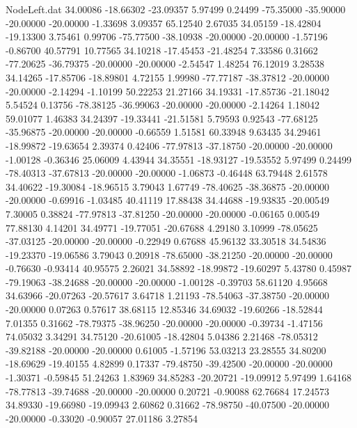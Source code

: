 \begin{filecontents}{NodeLeft.dat}
  34.00086  -18.66302  -23.09357     5.97499    0.24499  -75.35000  -35.90000  -20.00000  -20.00000   -1.33698    3.09357   65.12540    2.67035
  34.05159  -18.42804  -19.13300     3.75461    0.99706  -75.77500  -38.10938  -20.00000  -20.00000   -1.57196   -0.86700   40.57791   10.77565
  34.10218  -17.45453  -21.48254     7.33586    0.31662  -77.20625  -36.79375  -20.00000  -20.00000   -2.54547    1.48254   76.12019    3.28538
  34.14265  -17.85706  -18.89801     4.72155    1.99980  -77.77187  -38.37812  -20.00000  -20.00000   -2.14294   -1.10199   50.22253   21.27166
  34.19331  -17.85736  -21.18042     5.54524    0.13756  -78.38125  -36.99063  -20.00000  -20.00000   -2.14264    1.18042   59.01077    1.46383
  34.24397  -19.33441  -21.51581     5.79593    0.92543  -77.68125  -35.96875  -20.00000  -20.00000   -0.66559    1.51581   60.33948    9.63435
  34.29461  -18.99872  -19.63654     2.39374    0.42406  -77.97813  -37.18750  -20.00000  -20.00000   -1.00128   -0.36346   25.06009    4.43944
  34.35551  -18.93127  -19.53552     5.97499    0.24499  -78.40313  -37.67813  -20.00000  -20.00000   -1.06873   -0.46448   63.79448    2.61578
  34.40622  -19.30084  -18.96515     3.79043    1.67749  -78.40625  -38.36875  -20.00000  -20.00000   -0.69916   -1.03485   40.41119   17.88438
  34.44688  -19.93835  -20.00549     7.30005    0.38824  -77.97813  -37.81250  -20.00000  -20.00000   -0.06165    0.00549   77.88130    4.14201
  34.49771  -19.77051  -20.67688     4.29180    3.10999  -78.05625  -37.03125  -20.00000  -20.00000   -0.22949    0.67688   45.96132   33.30518
  34.54836  -19.23370  -19.06586     3.79043    0.20918  -78.65000  -38.21250  -20.00000  -20.00000   -0.76630   -0.93414   40.95575    2.26021
  34.58892  -18.99872  -19.60297     5.43780    0.45987  -79.19063  -38.24688  -20.00000  -20.00000   -1.00128   -0.39703   58.61120    4.95668
  34.63966  -20.07263  -20.57617     3.64718    1.21193  -78.54063  -37.38750  -20.00000  -20.00000    0.07263    0.57617   38.68115   12.85346
  34.69032  -19.60266  -18.52844     7.01355    0.31662  -78.79375  -38.96250  -20.00000  -20.00000   -0.39734   -1.47156   74.05032    3.34291
  34.75120  -20.61005  -18.42804     5.04386    2.21468  -78.05312  -39.82188  -20.00000  -20.00000    0.61005   -1.57196   53.03213   23.28555
  34.80200  -18.69629  -19.40155     4.82899    0.17337  -79.48750  -39.42500  -20.00000  -20.00000   -1.30371   -0.59845   51.24263    1.83969
  34.85283  -20.20721  -19.09912     5.97499    1.64168  -78.77813  -39.74688  -20.00000  -20.00000    0.20721   -0.90088   62.76684   17.24573
  34.89330  -19.66980  -19.09943     2.60862    0.31662  -78.98750  -40.07500  -20.00000  -20.00000   -0.33020   -0.90057   27.01186    3.27854

\end{filecontents}
